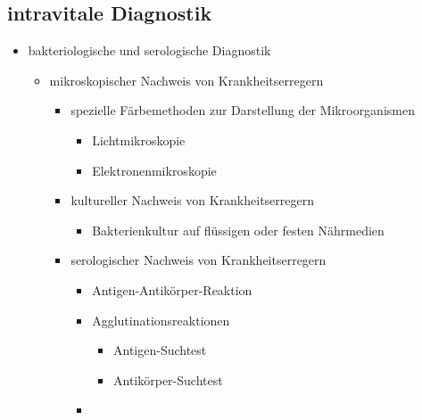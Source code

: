 \begin{it>emize}
\subsection{intravitale Diagnostik}
	\begin{itemize}
		\item bakteriologische und serologische Diagnostik
			\begin{itemize}
				\item mikroskopischer Nachweis von Krankheitserregern
					\begin{itemize}
						\item spezielle Färbemethoden zur Darstellung der Mikroorganismen
							\begin{itemize}
								\item Lichtmikroskopie
								\item Elektronenmikroskopie
							\end{itemize}
						\item kultureller Nachweis von Krankheitserregern
							\begin{itemize}
								\item Bakterienkultur auf flüssigen oder festen Nährmedien
							\end{itemize}
						\item serologischer Nachweis von Krankheitserregern
							\begin{itemize}
								\item Antigen-Antikörper-Reaktion
								\item Agglutinationsreaktionen
									\begin{itemize}
										\item Antigen-Suchtest
										\item Antikörper-Suchtest
									\end{itemize}
								\item 
							\end{itemize}
					\end{itemize}
			\end{itemize}
	\end{itemize}


\end{it>emize}
